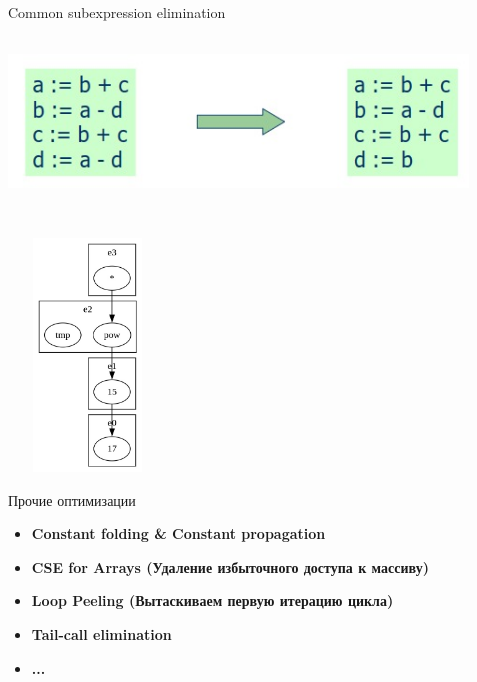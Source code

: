 \documentclass[aspectratio=169
  , xcolor={svgnames}
  , russian  %
  ]{beamer}
\begin{document}
\begin{frame}{Common subexpression elimination}
    \centering
    \includegraphics[width=12.2cm, height=5.2cm]{misc/egraphs_images/cse.jpeg}
\end{frame}

\begin{frame}{}
    \centering
    \includegraphics[width=4.2cm, height=6.2cm]{misc/egraphs_images/cse_demo.jpeg}
\end{frame}

\begin{frame}{Прочие оптимизации}
    \begin{itemize}
    \item \textbf{\fontsize{14.1}{12} Constant folding \& Constant propagation }
    \newline
    \item \textbf{\fontsize{14.1}{12} CSE for Arrays (Удаление избыточного доступа к массиву) }
    \newline
    \item \textbf{\fontsize{14.1}{12}  Loop Peeling (Вытаскиваем первую итерацию цикла)}
    \newline
    \item \textbf{\fontsize{14.1}{12}  Tail-call elimination}
    \newline
    \item \textbf{\fontsize{14.1}{12}  ...}
    \newline
    \end{itemize}
\end{frame}
\end{document}
